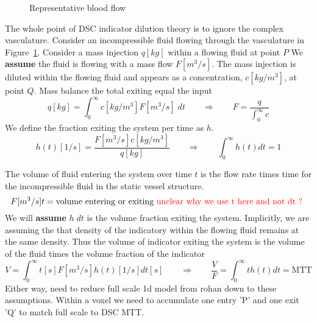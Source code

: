 \documentclass[12pt]{article}
\newcommand{\picdir}{pdffig}
\begin{document}
\begin{figure}[h]
\centering
{}
\caption{Representative blood flow
} \label{fig:DSCbloodflow}
\end{figure}

The whole point of DSC indicator dilution theory is to ignore the complex
vasculature. Consider an incompressible fluid flowing through the vasculature in Figure~\ref{fig:DSCbloodflow}.
Consider a mass injection $q [kg]$ within a flowing fluid at point $P$ 
We \textbf{assume} the fluid is flowing with a mass flow $F[m^3/s]$. 
The mass injection is diluted within the flowing fluid and appears as a
concentration, $c[kg/m^3]$,  at point $Q$.
Mass balance the total exiting equal the input
\[
    q [kg] = \int_0^\infty c[kg/m^3]F[m^3/s] \;dt  \qquad \Rightarrow  \qquad F = \frac{q }{\int_0^\infty c}
\]
We define the fraction exiting the system per time as $h$.
\[
      h(t)[1/s] = \frac{F [m^3/s] c [kg/m^3]}{q[kg]} \qquad \Rightarrow \qquad \int_0^\infty h(t) dt = 1
\]

The volume of fluid entering the system over time $t$ is the flow rate times
time for the incompressible fluid in the static vessel structure.
\[
  F[m^3/s] t = \text{volume entering or exiting \color{red} unclear why we use t here and not dt ? }
\]
We  will \textbf{assume} $h \; dt$ is the volume fraction exiting the system.
Implicitly, we are assuming the that density of the indicatory within the
flowing fluid remains at the same density. 
Thus the volume of indicator exiting the system is the volume of the fluid times
the volume fraction of the indicator
\[
   V = \int_0^\infty t [s] F[m^3/s] h(t) [1/s] dt [s]
\qquad \Rightarrow \qquad
   \frac{V}{F} = \int_0^\infty t  h(t)  dt  = \text{MTT}
\]
Either way, need to reduce full scale 1d model from rohan down to these
assumptions. Within a voxel we need to accumulate one entry 'P' and one exit 'Q'
to match full scale to DSC MTT.
\end{document}
